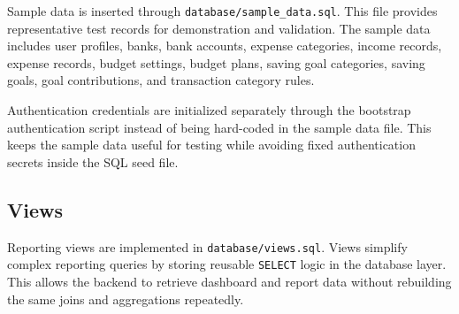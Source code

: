 \documentclass{article}
\begin{document}
Sample data is inserted through \texttt{database/sample\_data.sql}. This file provides 
representative test records for demonstration and validation. The sample data includes user 
profiles, banks, bank accounts, expense categories, income records, expense records, budget 
settings, budget plans, saving goal categories, saving goals, goal contributions, and 
transaction category rules.

Authentication credentials are initialized separately through the bootstrap authentication 
script instead of being hard-coded in the sample data file. This keeps the sample data useful 
for testing while avoiding fixed authentication secrets inside the SQL seed file.

\subsection{Views}

Reporting views are implemented in \texttt{database/views.sql}. Views simplify complex 
reporting queries by storing reusable \texttt{SELECT} logic in the database layer. This allows 
the backend to retrieve dashboard and report data without rebuilding the same joins and 
aggregations repeatedly.

\footnotesize
\renewcommand{\arraystretch}{1.15}
\end{document}
